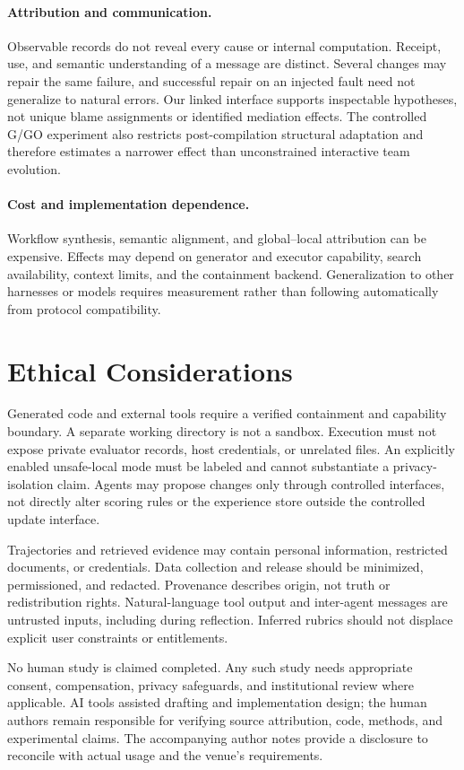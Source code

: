 \documentclass[11pt]{article}
\begin{document}
\paragraph{Attribution and communication.}
Observable records do not reveal every cause or internal computation. Receipt, use, and semantic understanding of a message are distinct. Several changes may repair the same failure, and successful repair on an injected fault need not generalize to natural errors. Our linked interface supports inspectable hypotheses, not unique blame assignments or identified mediation effects. The controlled G/GO experiment also restricts post-compilation structural adaptation and therefore estimates a narrower effect than unconstrained interactive team evolution.

\paragraph{Cost and implementation dependence.}
Workflow synthesis, semantic alignment, and global--local attribution can be expensive. Effects may depend on generator and executor capability, search availability, context limits, and the containment backend. Generalization to other harnesses or models requires measurement rather than following automatically from protocol compatibility.

\section*{Ethical Considerations}

Generated code and external tools require a verified containment and capability boundary. A separate working directory is not a sandbox. Execution must not expose private evaluator records, host credentials, or unrelated files. An explicitly enabled unsafe-local mode must be labeled and cannot substantiate a privacy-isolation claim. Agents may propose changes only through controlled interfaces, not directly alter scoring rules or the experience store outside the controlled update interface.

Trajectories and retrieved evidence may contain personal information, restricted documents, or credentials. Data collection and release should be minimized, permissioned, and redacted. Provenance describes origin, not truth or redistribution rights. Natural-language tool output and inter-agent messages are untrusted inputs, including during reflection. Inferred rubrics should not displace explicit user constraints or entitlements.

No human study is claimed completed. Any such study needs appropriate consent, compensation, privacy safeguards, and institutional review where applicable. AI tools assisted drafting and implementation design; the human authors remain responsible for verifying source attribution, code, methods, and experimental claims. The accompanying author notes provide a disclosure to reconcile with actual usage and the venue's requirements.

\clearpage

\clearpage
\appendix

\end{document}
